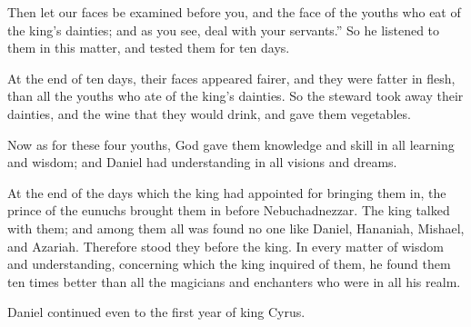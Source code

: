 {Then let our faces be examined before you, and the face of the youths who eat of the king’s dainties; and as you see, deal with your servants.”
So he listened to them in this matter, and tested them for ten days.
\par }{\PP {}At the end of ten days, their faces appeared fairer, and they were fatter in flesh, than all the youths who ate of the king’s dainties.
So the steward took away their dainties, and the wine that they would drink, and gave them vegetables.
\par }{\PP {}Now as for these four youths, God gave them knowledge and skill in all learning and wisdom; and Daniel had understanding in all visions and dreams.
\par }{\PP {}At the end of the days which the king had appointed for bringing them in, the prince of the eunuchs brought them in before Nebuchadnezzar.
The king talked with them; and among them all was found no one like Daniel, Hananiah, Mishael, and Azariah. Therefore stood they before the king.
In every matter of wisdom and understanding, concerning which the king inquired of them, he found them ten times better than all the magicians and enchanters who were in all his realm.
\par }{\PP {}Daniel continued even to the first year of king Cyrus.

}
